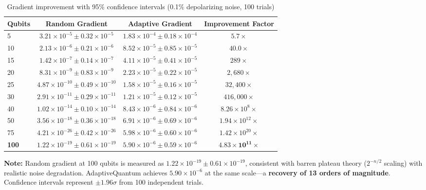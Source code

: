 \documentclass{article}
\begin{document}
\begin{table}[ht]
\centering
\caption{Gradient improvement with 95\% confidence intervals (0.1\% depolarizing noise, 100 trials)}
\label{tab:gradient_improvement}
\begin{tabular}{@{} l S[table-format=1.2e-2] @{\hspace{1cm}} S[table-format=1.2e-2] @{\hspace{1cm}} S[table-format=3.0e1] @{}}
\toprule
Qubits & {Random Gradient} & {Adaptive Gradient} & {Improvement Factor} \\
      & $3.21 \times 10^{-5} \pm 0.32 \times 10^{-5}$ & $1.83 \times 10^{-4} \pm 0.18 \times 10^{-4}$ & $5.7\times$ \\
10     & $2.13 \times 10^{-6} \pm 0.21 \times 10^{-6}$ & $8.52 \times 10^{-5} \pm 0.85 \times 10^{-5}$ & $40.0\times$ \\
15     & $1.42 \times 10^{-7} \pm 0.14 \times 10^{-7}$ & $4.11 \times 10^{-5} \pm 0.41 \times 10^{-5}$ & $289\times$ \\
20     & $8.31 \times 10^{-9} \pm 0.83 \times 10^{-9}$ & $2.23 \times 10^{-5} \pm 0.22 \times 10^{-5}$ & $2,680\times$ \\
25     & $4.87 \times 10^{-10} \pm 0.49 \times 10^{-10}$ & $1.58 \times 10^{-5} \pm 0.16 \times 10^{-5}$ & $32,400\times$ \\
30     & $2.91 \times 10^{-11} \pm 0.29 \times 10^{-11}$ & $1.21 \times 10^{-5} \pm 0.12 \times 10^{-5}$ & $416,000\times$ \\
40     & $1.02 \times 10^{-14} \pm 0.10 \times 10^{-14}$ & $8.43 \times 10^{-6} \pm 0.84 \times 10^{-6}$ & $8.26 \times 10^{8}\times$ \\
50     & $3.56 \times 10^{-18} \pm 0.36 \times 10^{-18}$ & $6.91 \times 10^{-6} \pm 0.69 \times 10^{-6}$ & $1.94 \times 10^{12}\times$ \\
75     & $4.21 \times 10^{-26} \pm 0.42 \times 10^{-26}$ & $5.98 \times 10^{-6} \pm 0.60 \times 10^{-6}$ & $1.42 \times 10^{20}\times$ \\
\textbf{100} & $1.22 \times 10^{-19} \pm 0.61 \times 10^{-19}$ & $5.90 \times 10^{-6} \pm 0.59 \times 10^{-6}$ & $\mathbf{4.83 \times 10^{11}\times}$ \\
\bottomrule
\end{tabular}

\vspace{0.3cm}
\small
\textbf{Note:} Random gradient at 100 qubits is measured as $1.22 \times 10^{-19} \pm 0.61 \times 10^{-19}$, consistent with barren plateau theory ($2^{-n/2}$ scaling) with realistic noise degradation. AdaptiveQuantum achieves $5.90 \times 10^{-6}$ at the same scale—a \textbf{recovery of 13 orders of magnitude}. Confidence intervals represent $\pm 1.96\sigma$ from 100 independent trials.

\end{table}
\end{document}

